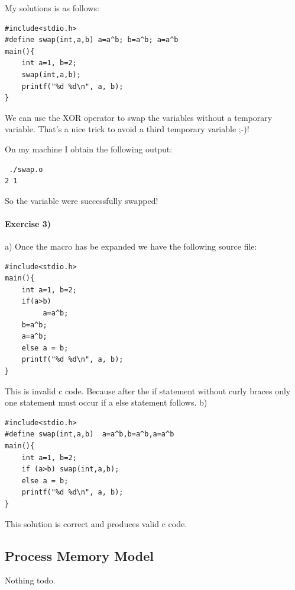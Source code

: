 \documentclass[12pt]{article}
\begin{document}
My solutions is as follows:
\begin{lstlisting}
#include<stdio.h>
#define swap(int,a,b) a=a^b; b=a^b; a=a^b
main(){
	int a=1, b=2;
	swap(int,a,b);
	printf("%d %d\n", a, b);
}
\end{lstlisting}
We can use the XOR operator to swap the variables without a temporary variable.
That's a nice trick to avoid a third temporary variable ;-)!

On my machine I obtain the following output:
\begin{lstlisting}
 ./swap.o 
2 1
\end{lstlisting}
So the variable were successfully swapped!

\paragraph{Exercise 3)}
a)
Once the macro has be expanded we have the following source file:
\begin{lstlisting}
#include<stdio.h>
main(){
	int a=1, b=2;
	if(a>b)
	     a=a^b; 
	b=a^b; 
	a=a^b;
	else a = b;
	printf("%d %d\n", a, b);
}
\end{lstlisting}

This is invalid c code. Because after the if statement without curly braces only one statement must occur if a else statement follows.
b)
\begin{lstlisting}
#include<stdio.h>
#define swap(int,a,b)  a=a^b,b=a^b,a=a^b
main(){
	int a=1, b=2;
	if (a>b) swap(int,a,b);
	else a = b;
	printf("%d %d\n", a, b);
}
\end{lstlisting}

This solution is correct and produces valid c code.

\subsection*{Process Memory Model}
Nothing todo.
\end{document}
